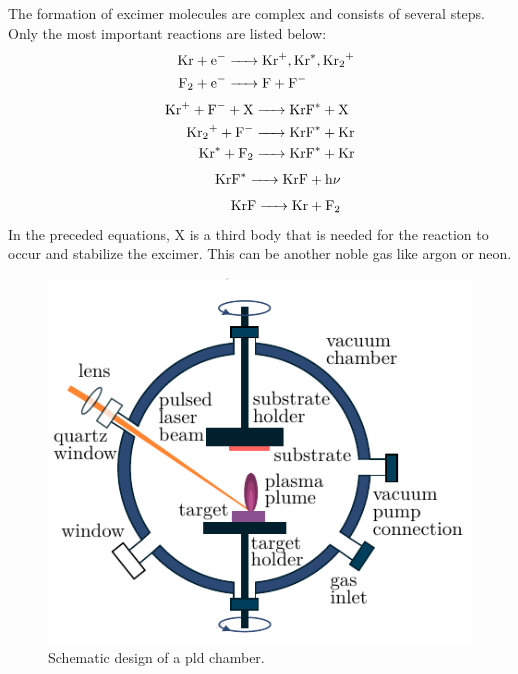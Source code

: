 The formation of excimer molecules are complex and consists of several steps.
Only the most important reactions are listed below:
\begin{align}
	\label{eq:excited_species}
	\begin{split}
		\ce{Kr + e- &-> Kr+, Kr^*, Kr_2^+} \\
		\ce{F2 + e- &-> F + F-}
	\end{split}\\
	\noalign{\vskip 0.1cm}
	\label{eq:excimer_formation}
	\begin{split}
		\ce{Kr+ + F- + X &-> KrF^* + X} \\
		\ce{Kr_2^+ + F- &-> KrF^* + Kr} \\
		\ce{Kr^* + F2 &-> KrF^* + Kr} 
	\end{split} \\
	\noalign{\vskip 0.1cm}
	\label{eq:excimer decay}
	\begin{split}
		\ce{KrF^* &-> KrF + h\nu}
	\end{split} \\
	\noalign{\vskip 0.1cm}
	\label{eq:dissociation}
	\begin{split}
		\ce{KrF &-> Kr + F_2}
	\end{split}
\end{align}
In the preceded equations, $\mathrm{X}$ is a third body that is needed for the reaction 
to occur and stabilize the excimer. 
This can be another noble gas like argon or neon.

\begin{figure}[h!]
	\centering
	\includegraphics{../assets/pld_chamber}
	\caption{Schematic design of a \ac{pld} chamber.}
	\label{fig:pld_chamber}
\end{figure}

